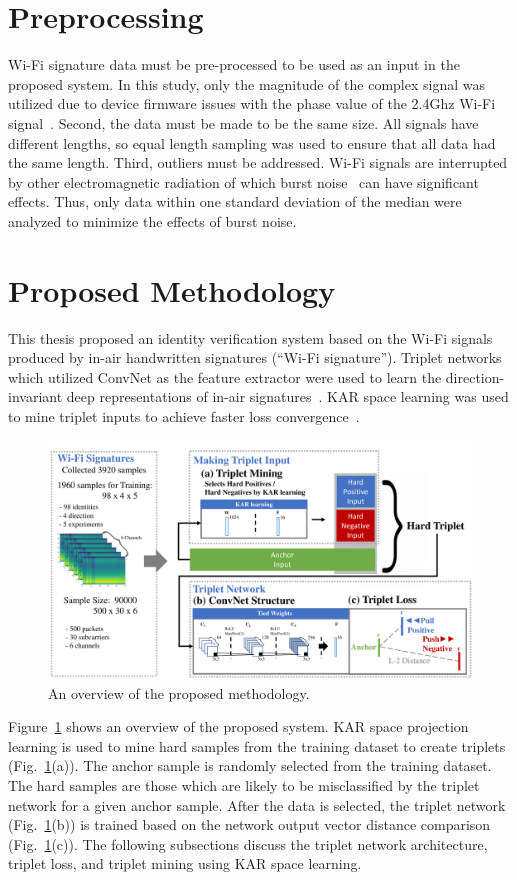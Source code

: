 \label{chp:Method}
\section{Preprocessing}
\label{sec:preprocessing}
Wi-Fi signature data must be pre-processed to be used as an input in the proposed system.
In this study, only the magnitude of the complex signal was utilized due to device firmware issues with the phase value of the 2.4Ghz Wi-Fi signal~\cite{wang2015understanding}.
Second, the data must be made to be the same size. All signals have different lengths, so equal length sampling was used to ensure that all data had the same length.
Third, outliers must be addressed. Wi-Fi signals are interrupted by other electromagnetic radiation of which burst noise~\cite{wang2015understanding} can have significant effects. Thus, only data within one standard deviation of the median were analyzed to minimize the effects of burst noise.
\section{Proposed Methodology}
\label{sec:methodology}
This thesis proposed an identity verification system based on the Wi-Fi signals produced by in-air handwritten signatures (``Wi-Fi signature''). 
Triplet networks which utilized ConvNet as the feature extractor were used to learn the direction-invariant deep representations of in-air signatures~\cite{hoffer2015deep}. KAR space learning was used to mine triplet inputs to achieve faster loss convergence~\cite{toh2018learning,toh2018gradient}. 
\begin{figure}[!ht]
    \includegraphics[width=\textwidth]
        {fig_system_overview_v1.pdf}
    \caption{An overview of the proposed methodology.} \label{fig1}
\end{figure}
Figure~\ref{fig1} shows an overview of the proposed system. 
KAR space projection learning is used to mine hard samples from the training dataset to create triplets (Fig.~\ref{fig1}(a)). The anchor sample is randomly selected from the training dataset. The hard samples are those which are likely to be misclassified by the triplet network for a given anchor sample.
After the data is selected, the triplet network (Fig.~\ref{fig1}(b)) is trained based on the network output vector distance comparison (Fig.~\ref{fig1}(c)).
The following subsections discuss the triplet network architecture, triplet loss, and triplet mining using KAR space learning.

